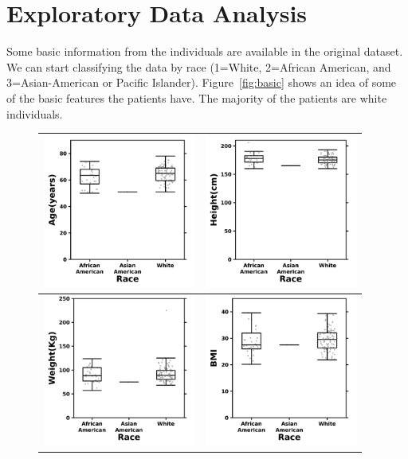 \documentclass[]{article}
\begin{document}
\section{Exploratory Data Analysis}

\noindent Some basic information from the individuals are available in the original dataset. 
We can start classifying the data by race (1=White, 2=African American, and 3=Asian-American 
or Pacific Islander). Figure~\ref{fig:basic} shows an idea of some of the basic features the 
patients have. The majority of the patients are white individuals. \\

\begin{figure}[H]
\centering
\begin{tabular}{|c|c|}
      \hline
      \includegraphics[width=50mm]{png/age.png} &
      \includegraphics[width=50mm]{png/height.png} \\
      \hline
      \includegraphics[width=50mm]{png/weight.png} & 
      \includegraphics[width=50mm]{png/bmi.png} \\

\end{tabular}
\end{figure}
\end{document}
